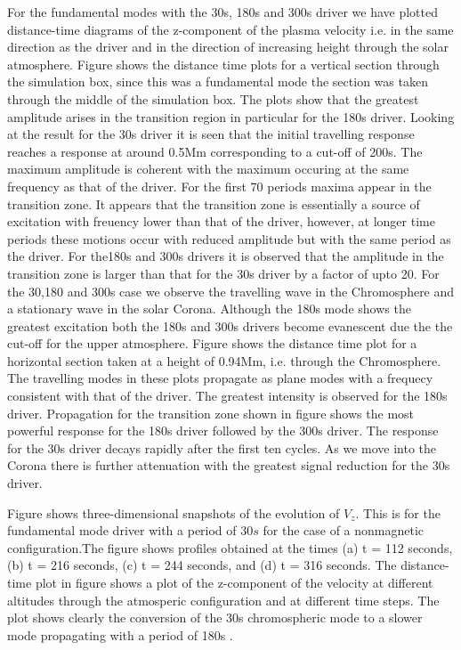 \documentclass[final,1p]{elsarticle}
\begin{document}
For the fundamental modes with the 30s, 180s and 300s driver we have plotted distance-time diagrams of the z-component of the plasma velocity i.e. in the same direction as the driver and in the direction of increasing height through the solar atmosphere.  Figure
 shows the distance time plots for a vertical section through the simulation box, since this was a fundamental mode the section was taken through the middle of the simulation box. The plots show that the greatest amplitude arises in the transition region in particular for the 180s driver. Looking at the result for the 30s driver it is seen that the initial travelling response reaches a response at around 0.5Mm corresponding to a cut-off of 200s. The maximum amplitude is coherent with the maximum occuring at the same frequency as that of the driver. For the first 70 periods maxima appear in the transition zone. It appears that the transition zone is essentially a source of excitation with freuency lower than that of the driver, however, at longer time periods these motions occur with reduced amplitude but with the same period as the driver. For the180s and 300s drivers it is observed that the amplitude in the transition zone is larger than that for the 30s driver by a factor of upto 20. For the 30,180 and 300s case we observe the travelling wave in the Chromosphere and a stationary wave in the solar Corona. Although the 180s mode shows the greatest excitation both the 180s and 300s drivers become evanescent due the the cut-off for the upper atmosphere. Figure  shows the distance time plot for a horizontal section taken at a height of 0.94Mm, i.e. through the Chromosphere. The travelling modes in these plots propagate as plane modes with a frequecy consistent with that of the driver. The greatest intensity is observed for the 180s driver. Propagation for the transition zone shown in figure  shows the most powerful response for the 180s driver followed by the 300s driver. The response for the 30s driver decays rapidly after the first ten cycles. As we move into the Corona there is further attenuation with the greatest signal reduction for the 30s driver.



Figure 
 shows three-dimensional snapshots of the evolution of $V_{z}$. This is for the fundamental mode driver with a period of $30s$ for the case of a nonmagnetic configuration.The figure shows profiles obtained at the times (a) t = 112 seconds, (b) t = 216 seconds, (c) t = 244 seconds, and (d) t = 316 seconds. The distance-time plot in figure 
shows a plot of the z-component of the velocity at different altitudes through the atmosperic configuration and at different time steps. The plot shows clearly the conversion of the 30s chromospheric mode to a slower mode propagating with a period of 180s \cite{Leibacher1982}. 
\end{document}
